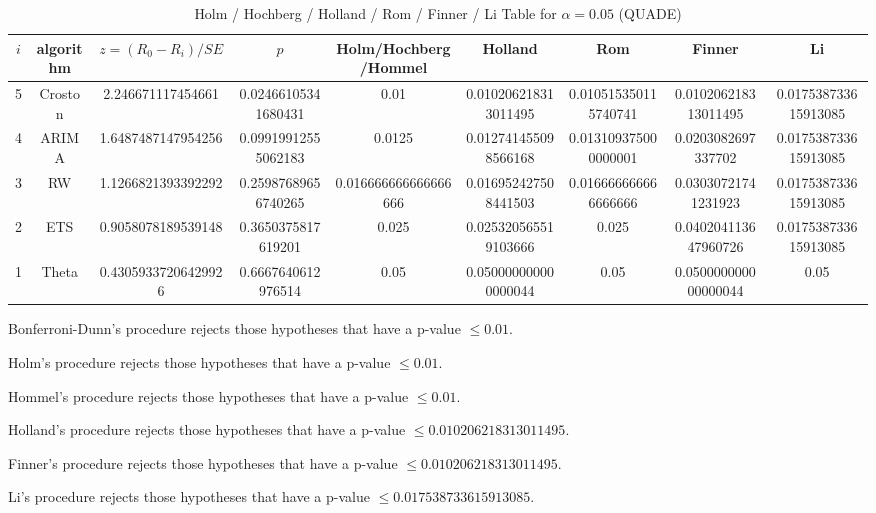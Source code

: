 \documentclass[a4paper,10pt]{article}
\begin{document}
\begin{landscape}
\begin{table}[!htp]
\centering\scriptsize
\caption{Holm / Hochberg / Holland / Rom / Finner / Li Table for $\alpha=0.05$ (QUADE)}
\begin{tabular}{ccccccccc}
$i$&algorithm&$z=(R_0 - R_i)/SE$&$p$&Holm/Hochberg/Hommel&Holland&Rom&Finner&Li\\
\hline
5&Croston&2.246671117454661&0.02466105341680431&0.01&0.010206218313011495&0.010515350115740741&0.010206218313011495&0.017538733615913085\\
4&ARIMA&1.6487487147954256&0.09919912555062183&0.0125&0.012741455098566168&0.013109375000000001&0.0203082697337702&0.017538733615913085\\
3&RW&1.1266821393392292&0.25987689656740265&0.016666666666666666&0.016952427508441503&0.016666666666666666&0.03030721741231923&0.017538733615913085\\
2&ETS&0.9058078189539148&0.3650375817619201&0.025&0.025320565519103666&0.025&0.040204113647960726&0.017538733615913085\\
1&Theta&0.43059337206429926&0.6667640612976514&0.05&0.050000000000000044&0.05&0.050000000000000044&0.05\\
\hline
\end{tabular}
\end{table}
Bonferroni-Dunn's procedure rejects those hypotheses that have a p-value $\le0.01$.


Holm's procedure rejects those hypotheses that have a p-value $\le0.01$.


Hommel's procedure rejects those hypotheses that have a p-value $\le0.01$.


Holland's procedure rejects those hypotheses that have a p-value $\le0.010206218313011495$.


Finner's procedure rejects those hypotheses that have a p-value $\le0.010206218313011495$.


Li's procedure rejects those hypotheses that have a p-value $\le0.017538733615913085$.



\newpage


\end{landscape}
\end{document}
